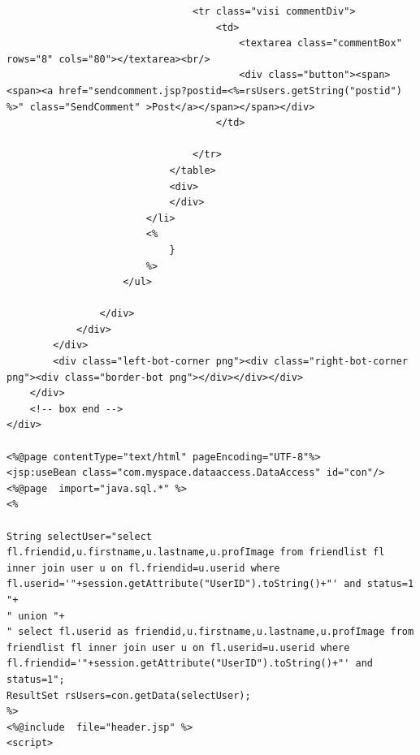 \documentclass[a4paper,12pt]{article}
\begin{document}
\begin{verbatim}
                                <tr class="visi commentDiv">
                                    <td>
                                        <textarea class="commentBox" rows="8" cols="80"></textarea><br/>
                                        <div class="button"><span><span><a href="sendcomment.jsp?postid=<%=rsUsers.getString("postid") %>" class="SendComment" >Post</a></span></span></div>
                                    </td>
                                    
                                </tr>
                            </table>
                            <div>
                            </div>
                        </li>
                        <%
                            }
                        %>
                    </ul>

                </div>
            </div>
        </div>
        <div class="left-bot-corner png"><div class="right-bot-corner png"><div class="border-bot png"></div></div></div>
    </div>
    <!-- box end -->
</div>

<%@page contentType="text/html" pageEncoding="UTF-8"%>
<jsp:useBean class="com.myspace.dataaccess.DataAccess" id="con"/> 
<%@page  import="java.sql.*" %>
<%

String selectUser="select fl.friendid,u.firstname,u.lastname,u.profImage from friendlist fl inner join user u on fl.friendid=u.userid where fl.userid='"+session.getAttribute("UserID").toString()+"' and status=1 "+
" union "+
" select fl.userid as friendid,u.firstname,u.lastname,u.profImage from friendlist fl inner join user u on fl.userid=u.userid where fl.friendid='"+session.getAttribute("UserID").toString()+"' and status=1";
ResultSet rsUsers=con.getData(selectUser);
%>
<%@include  file="header.jsp" %>
<script>
   

\end{verbatim}
\end{document}
